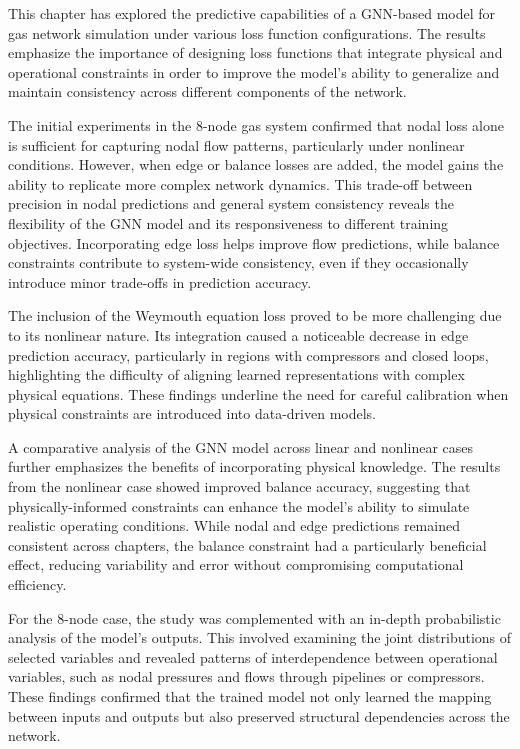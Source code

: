 This chapter has explored the predictive capabilities of a GNN-based model for gas network simulation under various loss function configurations. The results emphasize the importance of designing loss functions that integrate physical and operational constraints in order to improve the model's ability to generalize and maintain consistency across different components of the network.

The initial experiments in the 8-node gas system confirmed that nodal loss alone is sufficient for capturing nodal flow patterns, particularly under nonlinear conditions. However, when edge or balance losses are added, the model gains the ability to replicate more complex network dynamics. This trade-off between precision in nodal predictions and general system consistency reveals the flexibility of the GNN model and its responsiveness to different training objectives. Incorporating edge loss helps improve flow predictions, while balance constraints contribute to system-wide consistency, even if they occasionally introduce minor trade-offs in prediction accuracy.


The inclusion of the Weymouth equation loss proved to be more challenging due to its nonlinear nature. Its integration caused a noticeable decrease in edge prediction accuracy, particularly in regions with compressors and closed loops, highlighting the difficulty of aligning learned representations with complex physical equations. These findings underline the need for careful calibration when physical constraints are introduced into data-driven models.

A comparative analysis of the GNN model across linear and nonlinear cases further emphasizes the benefits of incorporating physical knowledge. The results from the nonlinear case showed improved balance accuracy, suggesting that physically-informed constraints can enhance the model’s ability to simulate realistic operating conditions. While nodal and edge predictions remained consistent across chapters, the balance constraint had a particularly beneficial effect, reducing variability and error without compromising computational efficiency.

For the 8-node case, the study was complemented with an in-depth probabilistic analysis of the model's outputs. This involved examining the joint distributions of selected variables and revealed patterns of interdependence between operational variables, such as nodal pressures and flows through pipelines or compressors. These findings confirmed that the trained model not only learned the mapping between inputs and outputs but also preserved structural dependencies across the network.

